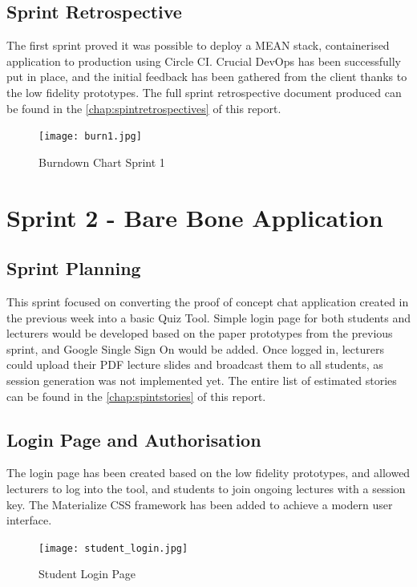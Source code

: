 \newpage
\subsection{Sprint Retrospective}
The first sprint proved it was possible to deploy a MEAN stack, containerised application
to production using Circle CI. Crucial DevOps has been successfully put in place, and the
initial feedback has been gathered from the client thanks to the low fidelity prototypes.
The full sprint retrospective document produced can be found in the \autoref{chap:spintretrospectives} of this report.

\begin{figure}[ht]
    \centering
    \texttt{[image: burn1.jpg]}
    \caption{Burndown Chart Sprint 1}
    \label{fig:burn1}
\end{figure}

\newpage
\section{Sprint 2 - Bare Bone Application}
\subsection{Sprint Planning}
This sprint focused on converting the proof of concept chat application created in the previous
week into a basic Quiz Tool. Simple login page for both students and lecturers
would be developed based on the paper prototypes from the previous sprint, and Google Single Sign
On would be added. Once logged in, lecturers could upload their PDF lecture slides and broadcast
them to all students, as session generation was not implemented yet. The entire list of estimated stories
can be found in the \autoref{chap:spintstories} of this report.

\newpage
\subsection{Login Page and Authorisation}
\label{sub:loginauth}
The login page has been created based on the low fidelity prototypes, and allowed
lecturers to log into the tool, and students to join ongoing lectures with a session key.
The Materialize\cite{43} CSS framework has been added to achieve a modern user interface.

\begin{figure}[h!]
    \centering
    \texttt{[image: student\_login.jpg]}
    \caption{Student Login Page}
    \label{fig:studentlogin}
\end{figure}

